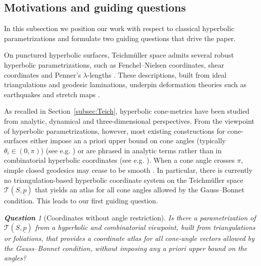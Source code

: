 \documentclass[11pt, letterpaper]{amsart}
\theoremstyle{definition}
\theoremstyle{remark}
\newtheorem{question}[theorem]{\rm\bf Question}
\newcommand{\up}{\underline{p}}
\newcommand{\cTp}{\mathcal{T} (S,\up)}
\numberwithin{equation}{section}
\begin{document}
\subsection{Motivations and guiding questions}
\label{subsec:motivation}

In this subsection we position our work with respect to classical hyperbolic parametrizations and formulate two guiding questions that drive the paper.

On punctured hyperbolic surfaces, Teichm\"uller space admits several robust hyperbolic parametrizations, such as Fenchel--Nielsen coordinates, shear coordinates \cite{Bon96, Thu98} and Penner's \(\lambda\)-lengths \cite{Pen87}.
These descriptions, built from ideal triangulations and geodesic laminations, underpin deformation theories such as earthquakes and stretch maps \cite{Thu84, Thu98}.


As recalled in Section~\ref{subsec:Teich}, hyperbolic cone-metrics have been studied from analytic, dynamical and three-dimensional perspectives. 
From the viewpoint of hyperbolic parametrizations, however, most existing constructions for cone-surfaces either impose an a priori upper bound on cone angles (typically \(\theta_i \in (0,\pi)\)) (see e.g. \cite{DP07, Pan17}) or are phrased in analytic terms rather than in combinatorial hyperbolic coordinates (see e.g. \cite{MW17}).
When a cone angle crosses \(\pi\), simple closed geodesics may cease to be smooth \cite[\S 4.6]{CHK00}.
In particular, there is currently no triangulation-based hyperbolic coordinate system on the Teichm\"uller space \(\cTp\) that yields an atlas for all cone angles allowed by the Gauss--Bonnet condition. 
This leads to our first guiding question.

\begin{question}[Coordinates without angle restriction]
  \label{Q:coor.Teich.}
  \textit{Is there a parametrization of \(\cTp\) from a hyperbolic and combinatorial viewpoint, built from triangulations or foliations, that provides a coordinate atlas for all cone-angle vectors allowed by the Gauss--Bonnet condition, without imposing any a priori upper bound on the angles?}
\end{question}
\end{document}
